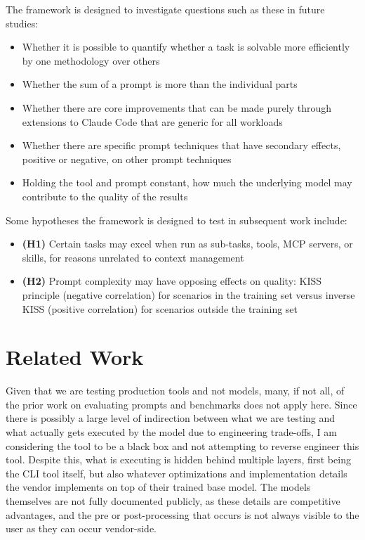 \documentclass[11pt]{article}
\begin{document}
The framework is designed to investigate questions such as these in future studies:

\begin{itemize}
\item Whether it is possible to quantify whether a task is solvable more efficiently by one methodology over others
\item Whether the sum of a prompt is more than the individual parts
\item Whether there are core improvements that can be made purely through extensions to Claude Code that are generic for all workloads
\item Whether there are specific prompt techniques that have secondary effects, positive or negative, on other prompt techniques
\item Holding the tool and prompt constant, how much the underlying model may contribute to the quality of the results
\end{itemize}

Some hypotheses the framework is designed to test in subsequent work include:

\begin{itemize}
\item \textbf{(H1)} Certain tasks may excel when run as sub-tasks, tools, MCP servers, or skills, for reasons unrelated to context management
\item \textbf{(H2)} Prompt complexity may have opposing effects on quality: KISS principle (negative correlation) for scenarios in the training set versus inverse KISS (positive correlation) for scenarios outside the training set
\end{itemize}

\section{Related Work}\label{sec:related}

Given that we are testing production tools and not models, many, if not all, of
the prior work on evaluating prompts and benchmarks does not apply here. Since
there is possibly a large level of indirection between what we are testing and
what actually gets executed by the model due to engineering trade-offs, I am
considering the tool to be a black box and not attempting to reverse engineer
this tool. Despite this, what is executing is hidden behind multiple layers,
first being the CLI tool itself, but also whatever optimizations and
implementation details the vendor implements on top of their trained base model.
The models themselves are not fully documented publicly, as these details are
competitive advantages, and the pre or post-processing that occurs is not always
visible to the user as they can occur vendor-side.
\end{document}
